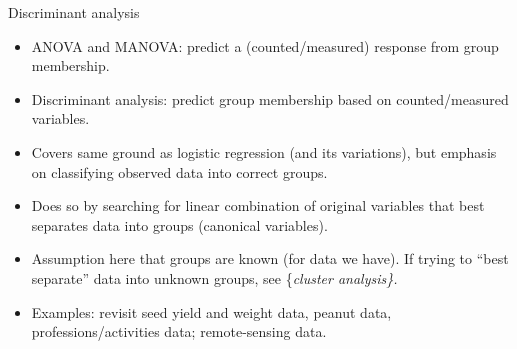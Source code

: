\documentclass[ignorenonframetext,]{beamer}
\begin{document}
\begin{frame}{Discriminant analysis}
\protect\hypertarget{discriminant-analysis}{}

\begin{itemize}
\item
  ANOVA and MANOVA: predict a (counted/measured) response from group
  membership.
\item
  Discriminant analysis: predict group membership based on
  counted/measured variables.
\item
  Covers same ground as logistic regression (and its variations), but
  emphasis on classifying observed data into correct groups.
\item
  Does so by searching for linear combination of original variables that
  best separates data into groups (canonical variables).
\item
  Assumption here that groups are known (for data we have). If trying to
  ``best separate'' data into unknown groups, see
  \{\em cluster analysis\}.
\item
  Examples: revisit seed yield and weight data, peanut data,
  professions/activities data; remote-sensing data.
\end{itemize}

\end{frame}
\end{document}
